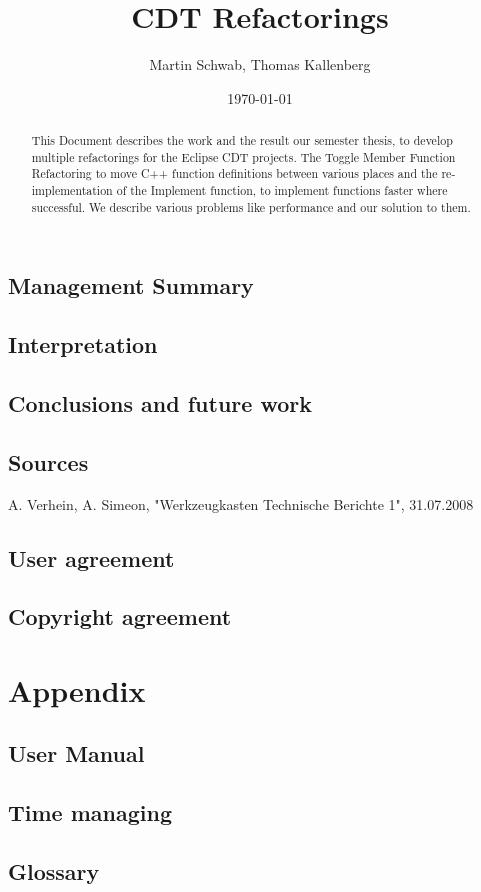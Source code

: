 \documentclass[a4paper,12pt]{scrreprt}
\title{CDT Refactorings}
\date{\today}
\author{Martin Schwab, Thomas Kallenberg}
\begin{document}
\maketitle
{}

\begin{abstract}
\thispagestyle{empty}
This Document describes the work and the result our semester thesis, to
develop multiple refactorings for the Eclipse CDT projects. The Toggle Member
Function Refactoring to move C++ function definitions between various places and
the re-implementation of the Implement function, to implement functions faster
where successful. We describe various problems like performance and our
solution to them.
\end{abstract}

\chapter*{Management Summary}
\thispagestyle{empty}

\tableofcontents
\thispagestyle{empty}







\chapter{Interpretation}
\thispagestyle{fancy}

\chapter{Conclusions and future work}
\thispagestyle{fancy}


\chapter{Sources}
\thispagestyle{fancy}
A. Verhein, A. Simeon, "Werkzeugkasten Technische Berichte 1", 31.07.2008

\chapter*{User agreement}
\chapter*{Copyright agreement}
\part{Appendix}
\chapter*{User Manual}
\chapter*{Time managing}
\chapter*{Glossary}

\thispagestyle{fancy}
\end{document}
